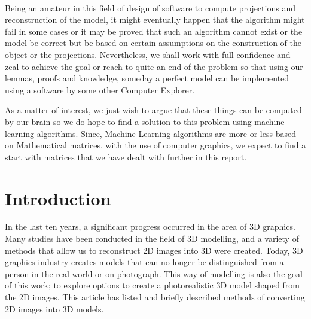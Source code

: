 \documentclass[12pt]{report}
\begin{document}
\\
\vspace{0.2cm}

Being an amateur in this field of design of software to compute projections and reconstruction of the model, it might eventually happen that the algorithm might fail in some cases or it may be proved that such an algorithm cannot exist or the model be correct but be based on certain assumptions on the construction of the object or the projections. Nevertheless, we shall work with full confidence and zeal to achieve the goal or reach to quite an end of the problem so that using our lemmas, proofs and knowledge, someday a perfect model can be implemented using a software by some other Computer Explorer. 
\\
\vspace{0.2cm}

As a matter of interest, we just wish to argue that these things can be computed by our brain so we do hope to find a solution to this problem using machine learning algorithms. Since, Machine Learning algorithms are more or less based on Mathematical matrices, with the use of computer graphics, we expect to find a start with matrices that we have dealt with further in this report. 


\newpage

\tableofcontents

\newpage

\chapter{Introduction}

In the last ten years, a significant progress occurred in the area of 3D graphics. Many studies have been conducted in the field of 3D modelling, and a variety of methods that allow us to reconstruct 2D images into 3D were created. Today, 3D graphics industry creates models that can no longer be distinguished from a person in the real world or on photograph. This way of modelling is also the goal of this work; to explore options to create a photorealistic 3D model shaped from the 2D images. This article has listed and briefly described methods of converting 2D images into 3D models.
\end{document}
